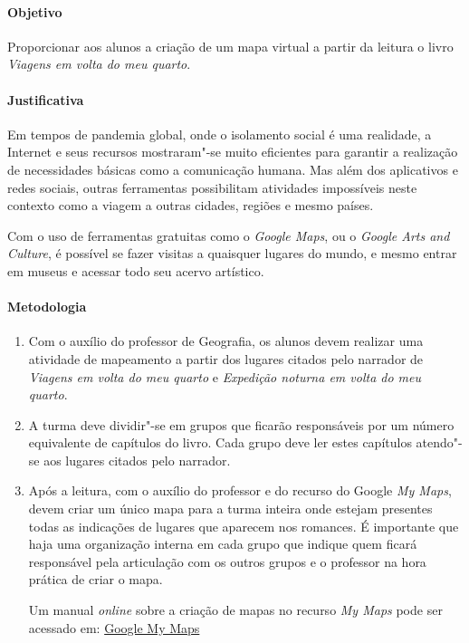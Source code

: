 \documentclass[12pt]{extarticle}
\begin{document}
\paragraph{Objetivo} Proporcionar aos alunos a criação de um mapa virtual
a partir da leitura o livro \emph{Viagens em volta do meu quarto}.

\paragraph{Justificativa} Em tempos de pandemia global, onde o isolamento
social é uma realidade, a Internet e seus recursos mostraram"-se 
muito eficientes para garantir a realização de necessidades básicas
como a comunicação humana. Mas além dos aplicativos e redes sociais,
outras ferramentas possibilitam atividades impossíveis neste contexto
como a viagem a outras cidades, regiões e mesmo países. 

Com o uso de ferramentas gratuitas como o \emph{Google Maps},
ou o \emph{Google Arts and Culture}, é possível se fazer
visitas a quaisquer lugares do mundo, e mesmo entrar em museus e 
acessar todo seu acervo artístico.

\paragraph{Metodologia}
\begin{enumerate}
	\item
	Com o auxílio do professor de Geografia, os alunos devem realizar uma
	atividade de mapeamento a partir dos lugares citados pelo 
	narrador de \emph{Viagens em volta do meu quarto} e \emph{Expedição noturna em volta do meu quarto}.

	\item
	A turma deve dividir"-se em grupos que ficarão responsáveis por um número
	equivalente de capítulos do livro. Cada grupo deve ler estes capítulos
	atendo"-se aos lugares citados pelo narrador. 

	\item
	Após a leitura, com o auxílio do professor e do recurso do Google \emph{My Maps}, 
	devem criar um único mapa para a turma inteira onde estejam presentes
	todas as indicações de lugares que aparecem nos romances. É importante que haja
	uma organização interna em cada grupo que indique quem ficará responsável
	pela articulação com os outros grupos e o professor na hora prática de 
	criar o mapa.

	Um manual \emph{online} sobre a criação de mapas no recurso \emph{My Maps}
	pode ser acessado em: \href{https://support.google.com/mymaps/topic/3024924?hl=pt-BR}{Google My Maps}

\end{enumerate}
\end{document}
